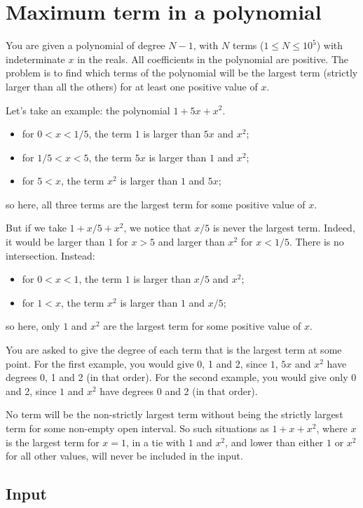 \documentclass[a4paper,12pt]{article}
\begin{document}
\section*{Maximum term in a polynomial}

You are given a polynomial of degree $N-1$, with $N$ terms ($1 \leq N \leq 10^5$) with indeterminate $x$ in the reals.
All coefficients in the polynomial are positive.
The problem is to find which terms of the polynomial will be the largest term (strictly larger than all the others) for at least one positive value of $x$.

Let's take an example: the polynomial $1 + 5x + x^2$.
\begin{itemize}
    \item for $0 < x < 1/5$, the term $1$ is larger than $5x$ and $x^2$;
    \item for $1/5 < x < 5$, the term $5x$ is larger than $1$ and $x^2$;
    \item for $5 < x$, the term $x^2$ is larger than $1$ and $5x$;
\end{itemize}
so here, all three terms are the largest term for some positive value of $x$.

But if we take $1 + x/5 + x^2$, we notice that $x/5$ is never the largest term.
Indeed, it would be larger than $1$ for $x > 5$ and larger than $x^2$ for $x < 1/5$.
There is no intersection. Instead:
\begin{itemize}
    \item for $0 < x < 1$, the term $1$ is larger than $x/5$ and $x^2$;
    \item for $1 < x$, the term $x^2$ is larger than $1$ and $x/5$;
\end{itemize}
so here, only $1$ and $x^2$ are the largest term for some positive value of $x$.

You are asked to give the degree of each term that is the largest term at some point.
For the first example, you would give 0, 1 and 2, since $1$, $5x$ and $x^2$ have degrees 0, 1 and 2 (in that order).
For the second example, you would give only 0 and 2, since $1$ and $x^2$ have degrees 0 and 2 (in that order).

No term will be the non-strictly largest term without being the strictly largest term for some non-empty open interval.
So such situations as $1 + x + x^2$, where $x$ is the largest term for $x=1$, in a tie with $1$ and $x^2$, and lower than either $1$ or $x^2$ for all other values, will never be included in the input.

\subsection*{Input}
\end{document}
